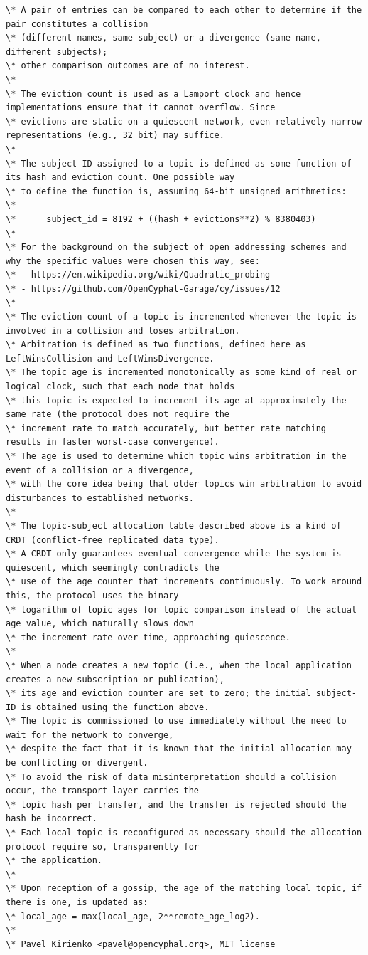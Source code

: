 \begin{verbatim}
\* A pair of entries can be compared to each other to determine if the pair constitutes a collision
\* (different names, same subject) or a divergence (same name, different subjects);
\* other comparison outcomes are of no interest.
\*
\* The eviction count is used as a Lamport clock and hence implementations ensure that it cannot overflow. Since
\* evictions are static on a quiescent network, even relatively narrow representations (e.g., 32 bit) may suffice.
\*
\* The subject-ID assigned to a topic is defined as some function of its hash and eviction count. One possible way
\* to define the function is, assuming 64-bit unsigned arithmetics:
\*
\*      subject_id = 8192 + ((hash + evictions**2) % 8380403)
\*
\* For the background on the subject of open addressing schemes and why the specific values were chosen this way, see:
\* - https://en.wikipedia.org/wiki/Quadratic_probing
\* - https://github.com/OpenCyphal-Garage/cy/issues/12
\*
\* The eviction count of a topic is incremented whenever the topic is involved in a collision and loses arbitration.
\* Arbitration is defined as two functions, defined here as LeftWinsCollision and LeftWinsDivergence.
\* The topic age is incremented monotonically as some kind of real or logical clock, such that each node that holds
\* this topic is expected to increment its age at approximately the same rate (the protocol does not require the
\* increment rate to match accurately, but better rate matching results in faster worst-case convergence).
\* The age is used to determine which topic wins arbitration in the event of a collision or a divergence,
\* with the core idea being that older topics win arbitration to avoid disturbances to established networks.
\*
\* The topic-subject allocation table described above is a kind of CRDT (conflict-free replicated data type).
\* A CRDT only guarantees eventual convergence while the system is quiescent, which seemingly contradicts the
\* use of the age counter that increments continuously. To work around this, the protocol uses the binary
\* logarithm of topic ages for topic comparison instead of the actual age value, which naturally slows down
\* the increment rate over time, approaching quiescence.
\*
\* When a node creates a new topic (i.e., when the local application creates a new subscription or publication),
\* its age and eviction counter are set to zero; the initial subject-ID is obtained using the function above.
\* The topic is commissioned to use immediately without the need to wait for the network to converge,
\* despite the fact that it is known that the initial allocation may be conflicting or divergent.
\* To avoid the risk of data misinterpretation should a collision occur, the transport layer carries the
\* topic hash per transfer, and the transfer is rejected should the hash be incorrect.
\* Each local topic is reconfigured as necessary should the allocation protocol require so, transparently for
\* the application.
\*
\* Upon reception of a gossip, the age of the matching local topic, if there is one, is updated as:
\* local_age = max(local_age, 2**remote_age_log2).
\*
\* Pavel Kirienko <pavel@opencyphal.org>, MIT license


\end{verbatim}
